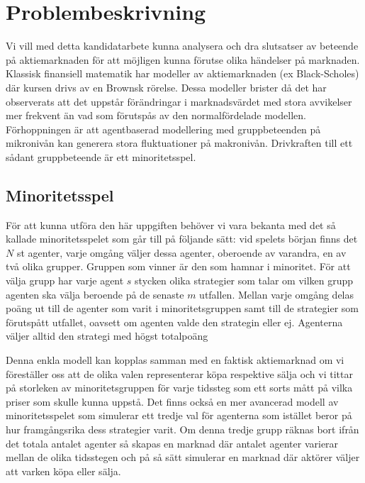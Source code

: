 \section{Problembeskrivning}


Vi vill med detta kandidatarbete kunna analysera och dra slutsatser av beteende på aktiemarknaden för att möjligen kunna förutse olika händelser på marknaden. Klassisk finansiell matematik har modeller av aktiemarknaden (ex Black-Scholes) där kursen drivs av en Brownsk rörelse. Dessa modeller brister då det har observerats att det uppstår förändringar i marknadsvärdet med stora avvikelser mer frekvent än vad som förutspås av den normalfördelade modellen. Förhoppningen är att agentbaserad modellering med gruppbeteenden på mikronivån kan generera stora fluktuationer på makronivån. Drivkraften till ett sådant gruppbeteende är ett minoritetsspel.

\subsection{Minoritetsspel}
För att kunna utföra den här uppgiften behöver vi vara bekanta med det så kallade minoritetsspelet som går till på följande sätt: vid spelets början finns det $N$ st agenter, varje omgång väljer dessa agenter, oberoende av varandra, en av två olika grupper. Gruppen som vinner är den som hamnar i minoritet. För att välja grupp har varje agent $s$ stycken olika strategier som talar om vilken grupp agenten ska välja beroende på de senaste $m$ utfallen. Mellan varje omgång delas poäng ut till de agenter som varit i minoritetsgruppen samt till de strategier som förutspått utfallet, oavsett om agenten valde den strategin eller ej. Agenterna väljer alltid den strategi med högst totalpoäng 

Denna enkla modell kan kopplas samman med en faktisk aktiemarknad om vi föreställer oss att de olika valen representerar köpa respektive sälja och vi tittar på storleken av minoritetsgruppen för varje tidssteg som ett sorts mått på vilka priser som skulle kunna uppstå. Det finns också en mer avancerad modell av minoritetsspelet som simulerar ett tredje val för agenterna som istället beror på hur framgångsrika dess strategier varit. Om denna tredje grupp räknas bort ifrån det totala antalet agenter så skapas en marknad där antalet agenter varierar mellan de olika tidsstegen och på så sätt simulerar en marknad där aktörer väljer att varken köpa eller sälja. 

